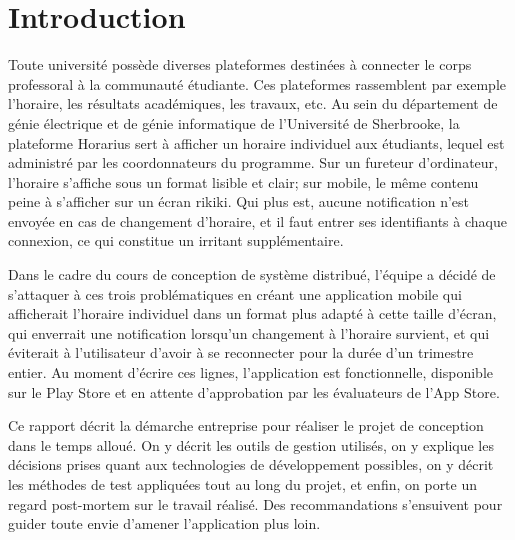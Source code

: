 \section{Introduction}
Toute université possède diverses plateformes destinées à connecter le corps professoral à la communauté étudiante. Ces plateformes rassemblent par exemple l'horaire, les résultats académiques, les travaux, etc. Au sein du département de génie électrique et de génie informatique de l'Université de Sherbrooke, la plateforme Horarius sert à afficher un horaire individuel aux étudiants, lequel est administré par les coordonnateurs du programme. Sur un fureteur d'ordinateur, l'horaire s'affiche sous un format lisible et clair; sur mobile, le même contenu peine à s'afficher sur un écran rikiki. Qui plus est, aucune notification n'est envoyée en cas de changement d'horaire, et il faut entrer ses identifiants à chaque connexion, ce qui constitue un irritant supplémentaire.

Dans le cadre du cours de conception de système distribué, l'équipe a décidé de s'attaquer à ces trois problématiques en créant une application mobile qui afficherait l'horaire individuel dans un format plus adapté à cette taille d'écran, qui enverrait une notification lorsqu'un changement à l'horaire survient, et qui éviterait à l'utilisateur d'avoir à se reconnecter pour la durée d'un trimestre entier. Au moment d'écrire ces lignes, l'application est fonctionnelle, disponible sur le Play Store et en attente d'approbation par les évaluateurs de l'App Store.

Ce rapport décrit la démarche entreprise pour réaliser le projet de conception dans le temps alloué. On y décrit les outils de gestion utilisés, on y explique les décisions prises quant aux  technologies de développement possibles, on y décrit les méthodes de test appliquées tout au long du projet, et enfin, on porte un regard post-mortem sur le travail réalisé. Des recommandations s'ensuivent pour guider toute envie d'amener l'application plus loin.